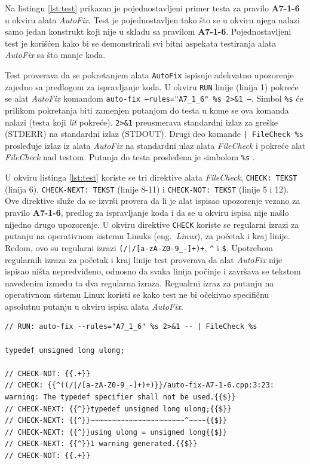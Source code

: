 \documentclass[12pt,oneside]{memoir}
\begin{document}
Na listingu \ref{lst:test} prikazan je pojednostavljeni primer testa za pravilo \textbf{A7-1-6} u okviru alata \textit{AutoFix}. Test je pojednostavljen tako \v{s}to se u okviru njega nalazi samo jedan konstrukt koji nije u skladu sa pravilom \textbf{A7-1-6}. Pojednostavljeni test je kori\v{s}\'{c}en kako bi se demonstrirali svi bitni aspekata testiranja alata \textit{AutoFix} sa \v{s}to manje koda. \par Test
proverava da se pokretanjem alata \texttt{AutoFix} ispisuje adekvatno upozorenje zajedno sa predlogom za ispravljanje koda. U okviru \texttt{RUN} linije (linija 1) pokre\'{c}e se alat \textit{AutoFix} komandom \texttt{auto-fix --rules="A7\_1\_6" \%s 2>\&1 --}. Simbol \texttt{\%s}  \'{c}e prilikom pokretanja biti zamenjen putanjom do testa u kome se ova komanda nalazi (testa koji \textit{lit} pokre\'{c}e). \texttt{2>\&1} preusmerava standardni izlaz za gre\v{s}ke (STDERR) na standardni izlaz (STDOUT). Drugi deo komande \texttt{| FileCheck \%s} prosleđuje izlaz iz alata \textit{AutoFix} na standardni ulaz alata \textit{FileCheck} i pokre\'{c}e alat \textit{FileCheck} nad testom. Putanja do testa prosleđena je simbolom \texttt{\%s} \cite{LIT}.

 U okviru listinga \ref{lst:test} koriste se tri direktive alata \textit{FileCheck}, \texttt{CHECK: TEKST} (linija 6), \texttt{CHECK-NEXT: TEKST} (linije 8-11) i \texttt{CHECK-NOT: TEKST} (linije 5 i 12). Ove direktive slu\v{z}e da se izvr\v{s}i provera da li je alat ispisao upozorenje vezano za pravilo \textbf{A7-1-6}, predlog za ispravljanje koda i da se u okviru ispisa nije na\v{s}lo nijedno drugo upozorenje. U okviru direktive \texttt{CHECK} koriste se regularni izrazi za putanju na operativnom sistemu Linuks (eng.~\textit{Linux}), za po\v{c}etak i kraj linije. Redom, ovo su regularni izrazi \lstinline[style=custombash]{(/|/[a-zA-Z0-9_-]+)+}, \lstinline[style=custombash]{^} i \lstinline[style=custombash]{$}. Upotrebom regularnih izraza za po\v{c}etak i kraj linije test proverava da alat \textit{AutoFix} nije ispisao ni\v{s}ta nepredviđeno, odnosno da svaka linija po\v{c}inje i zavr\v{s}ava se tekstom navedenim između ta dva regularna izraza. Regualrni izraz za putanju na operativnom sistemu Linux koristi se kako test ne bi o\v{c}ekivao specifi\v{c}nu apsolutnu putanju u okviru ispisa alata \textit{AutoFix}. 

\begin{lstlisting}[style=customc, caption={Pojednostavljeni primer testa za pravilo \textbf{A7-1-6} u okviru alata \textit{AutoFix}.},label={lst:test}]
// RUN: auto-fix --rules="A7_1_6" %s 2>&1 -- | FileCheck %s

typedef unsigned long ulong;

// CHECK-NOT: {{.+}}
// CHECK: {{^((/|/[a-zA-Z0-9_-]+)+)}}/auto-fix-A7-1-6.cpp:3:23: warning: The typedef specifier shall not be used.{{$}}
// CHECK-NEXT: {{^}}typedef unsigned long ulong;{{$}}
// CHECK-NEXT: {{^}}~~~~~~~~~~~~~~~~~~~~~~^~~~~{{$}}
// CHECK-NEXT: {{^}}using ulong = unsigned long{{$}}
// CHECK-NEXT: {{^}}1 warning generated.{{$}}
// CHECK-NOT: {{.+}}
\end{lstlisting}
\end{document}

